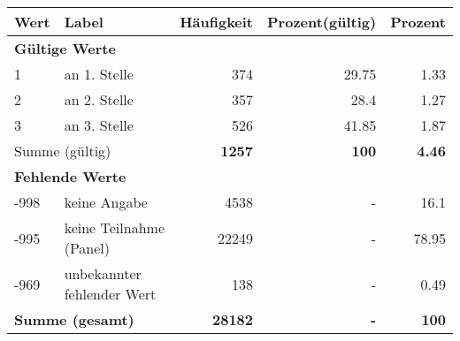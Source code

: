      \begin{longtable}{lXrrr}
     \toprule
     \textbf{Wert} & \textbf{Label} & \textbf{Häufigkeit} & \textbf{Prozent(gültig)} & \textbf{Prozent} \\
     \endhead
     \midrule
     \multicolumn{5}{l}{\textbf{Gültige Werte}}\\

     1 &
     \multicolumn{1}{X}{ an 1. Stelle   } &


       \num{374} &
       \num[round-mode=places,round-precision=2]{29,75} &
         \num[round-mode=places,round-precision=2]{1,33} \\

     2 &
     \multicolumn{1}{X}{ an 2. Stelle   } &


       \num{357} &
       \num[round-mode=places,round-precision=2]{28,4} &
         \num[round-mode=places,round-precision=2]{1,27} \\

     3 &
     \multicolumn{1}{X}{ an 3. Stelle   } &


       \num{526} &
       \num[round-mode=places,round-precision=2]{41,85} &
         \num[round-mode=places,round-precision=2]{1,87} \\
     \midrule
     \multicolumn{2}{l}{Summe (gültig)} &
       \textbf{\num{1257}} &
     \textbf{100} &
       \textbf{\num[round-mode=places,round-precision=2]{4,46}} \\
     \multicolumn{5}{l}{\textbf{Fehlende Werte}}\\
       -998 &
       keine Angabe &
         \num{4538} &
        - &
         \num[round-mode=places,round-precision=2]{16,1} \\
       -995 &
       keine Teilnahme (Panel) &
         \num{22249} &
        - &
         \num[round-mode=places,round-precision=2]{78,95} \\
       -969 &
       unbekannter fehlender Wert &
         \num{138} &
        - &
         \num[round-mode=places,round-precision=2]{0,49} \\
     \midrule
     \multicolumn{2}{l}{\textbf{Summe (gesamt)}} &
          \textbf{\num{28182}} &
        \textbf{-} &
        \textbf{100} \\
     \bottomrule
     \end{longtable}
     
